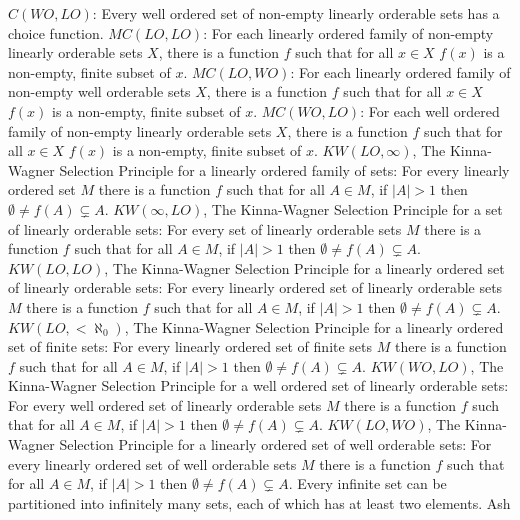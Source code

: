 \medskip
{} $C(WO,LO)$: Every well ordered set of
non-empty linearly orderable sets has a choice function.
\medskip
{} $MC(LO,LO)$: For each linearly ordered family
of non-empty linearly orderable sets $X$, there is a function $f$ such
that for all $x\in X$ $f(x)$ is a non-empty, finite subset of $x$.
\medskip
{} $MC(LO,WO)$: For each linearly ordered family
of non-empty well orderable sets $X$, there is a function $f$ such
that for all $x\in X$ $f(x)$ is a non-empty, finite subset of $x$.
\medskip
{} $MC(WO,LO)$: For each well ordered family
of non-empty linearly orderable sets $X$, there is a function $f$ such
that for all $x\in X$ $f(x)$ is a non-empty, finite subset of $x$.
\medskip
{} $KW(LO,\infty)$, The Kinna-Wagner Selection
Principle for a linearly ordered family of sets: For every linearly
ordered set $M$ there is a function $f$ such that for all $A\in M$,
if $|A|>1$ then $\emptyset\neq f(A)\subsetneq A$.
\medskip
{} $KW(\infty,LO)$, The Kinna-Wagner Selection
Principle for a set of linearly orderable sets: For every set of
linearly orderable sets $M$ there is a function $f$ such that for all
$A\in M$, if $|A|>1$ then $\emptyset\neq f(A)\subsetneq A$.
\medskip
{} $KW(LO,LO)$, The Kinna-Wagner Selection
Principle for a linearly ordered set of linearly orderable sets:
For every linearly ordered set of linearly orderable sets $M$ there
is a function $f$ such that for all $A\in M$, if $|A|>1$ then
$\emptyset\neq f(A)\subsetneq A$.
\medskip
{} $KW(LO,<\aleph_0)$, The Kinna-Wagner Selection
Principle for a linearly ordered set of finite sets: For every linearly
ordered set of finite sets $M$ there is a function $f$ such that for all
$A\in M$, if $|A|>1$ then $\emptyset\neq f(A)\subsetneq A$.
\medskip
{} $KW(WO,LO)$, The Kinna-Wagner Selection
Principle for a well ordered set of linearly orderable sets:
For every well ordered set of linearly orderable sets $M$ there
is a function $f$ such that for all $A\in M$, if $|A|>1$ then
$\emptyset\neq f(A)\subsetneq A$.
\medskip
{} $KW(LO,WO)$, The Kinna-Wagner Selection
Principle for a linearly ordered set of well orderable sets:
For every linearly ordered set of well orderable sets $M$ there
is a function $f$ such that for all $A\in M$, if $|A|>1$ then
$\emptyset\neq f(A)\subsetneq A$.
\medskip
{} Every infinite set can be partitioned into
infinitely many sets, each of which has at least two elements. \ac{Ash}

